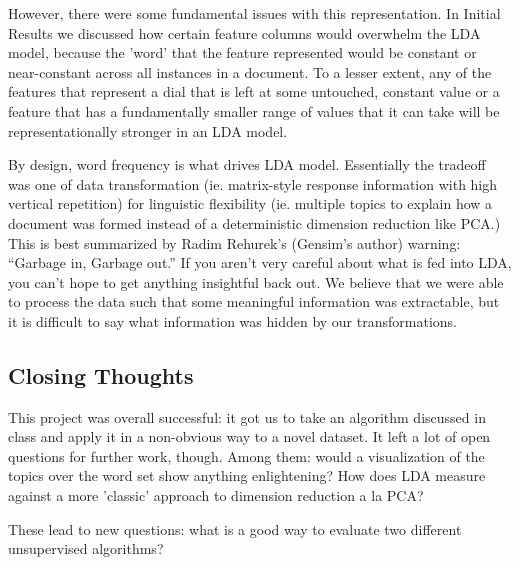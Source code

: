 However, there were some fundamental issues with this representation. In Initial Results we discussed how certain feature columns would overwhelm the LDA model, because the 'word' that the feature represented would be constant or near-constant across all instances in a document. To a lesser extent, any of the features that represent a dial that is left at some untouched, constant value or a feature that has a fundamentally smaller range of values that it can take will be representationally stronger in an LDA model.

By design, word frequency is what drives LDA model. Essentially the tradeoff was one of data transformation (ie. matrix-style response information with high vertical repetition) for linguistic flexibility (ie. multiple topics to explain how a document was formed instead of a deterministic dimension reduction like PCA.)\\

This is best summarized by Radim Rehurek's (Gensim's author) warning: ``Garbage in, Garbage out.'' If you aren't very careful about what is fed into LDA, you can't hope to get anything insightful back out. We believe that we were able to process the data such that some meaningful information was extractable, but it is difficult to say what information was hidden by our transformations.


\subsection{Closing Thoughts}
This project was overall successful: it got us to take an algorithm discussed in class and apply it in a non-obvious way to a novel dataset. It left a lot of open questions for further work, though. Among them: would a visualization of the topics over the word set show anything enlightening? How does LDA measure against a more 'classic' approach to dimension reduction a la PCA?

These lead to new questions: what is a good way to evaluate two different unsupervised algorithms?
